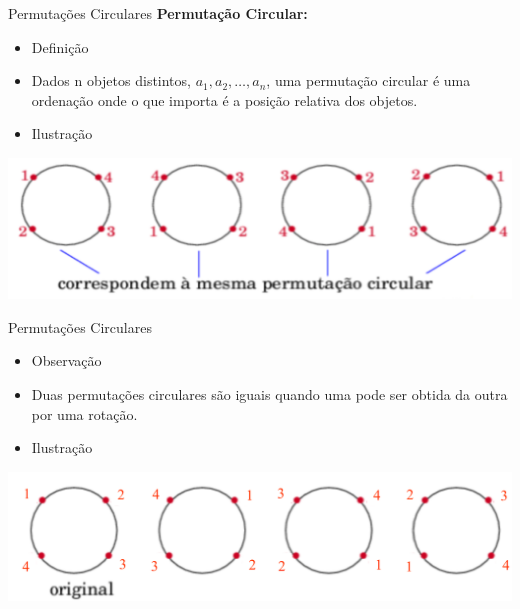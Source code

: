 \documentclass[aspectratio=169]{beamer}
\begin{document}
\begin{frame}{Permutações Circulares}
    \textbf{Permutação Circular:}
    
    \vspace{3mm}
\begin{itemize}
    \item Definição
    \item[] Dados n objetos distintos, $a_1, a_2, \ldots, a_n$, uma permutação circular é uma ordenação onde o que importa é a posição relativa dos objetos.
    \item Ilustração
\end{itemize}

\begin{center}
    \includegraphics[width=0.8\linewidth]{figs/permutacao_circular.png}
\end{center}

\end{frame}


\begin{frame}{Permutações Circulares}
\begin{itemize}
    \item Observação
    \item[] Duas permutações circulares são iguais quando uma pode ser obtida da outra por uma rotação.
    \item Ilustração
\end{itemize}

\begin{center}
    \includegraphics[width=0.8\linewidth]{figs/permutacao_circular_1.png}
\end{center}

\end{frame}
\end{document}
